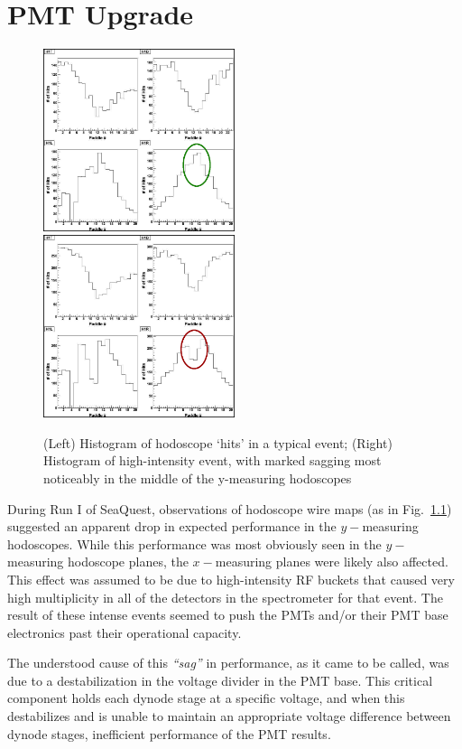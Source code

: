 \chapter{PMT Upgrade}

\begin{figure}
	\centerline{
		\mbox{\includegraphics[width=0.5\textwidth]{figures/nosag.jpg} \includegraphics[width=0.5\textwidth]{figures/sag.jpg}}
	}
	\caption{(Left) Histogram of hodoscope `hits' in a typical event; (Right) Histogram of high-intensity event, with marked sagging most noticeably in the middle of the y-measuring hodoscopes}
	\label{fig:sag}
\end{figure}

During Run I of SeaQuest, observations of hodoscope wire maps (as in Fig.~\ref{fig:sag}) suggested an apparent drop in expected performance in the $y-$measuring hodoscopes. While this performance was most obviously seen in the $y-$measuring hodoscope planes, the $x-$measuring planes were likely also affected. This effect was assumed to be due to high-intensity RF buckets that caused very high multiplicity in all of the detectors in the spectrometer for that event. The result of these intense events seemed to push the PMTs and/or their PMT base electronics past their operational capacity.

The understood cause of this \emph{``sag''} in performance, as it came to be called, was due to a destabilization in the voltage divider in the PMT base. This critical component holds each dynode stage at a specific voltage, and when this destabilizes and is unable to maintain an appropriate voltage difference between dynode stages, inefficient performance of the PMT results.

